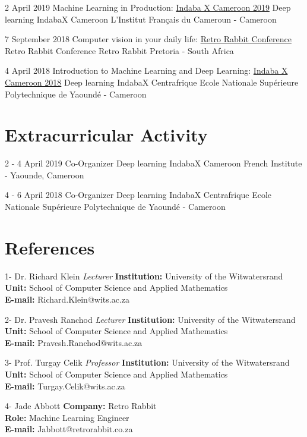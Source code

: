 \documentclass[letterpaper]{moderncv}        %
\begin{document}
\cventry
{2 April 2019}
{Machine Learning in Production:    \href{https://indabaxcameroon.github.io}{Indaba X Cameroon 2019}}
{Deep learning IndabaX Cameroon}
{L'Institut Français du Cameroun - Cameroon}
{}
{}


\cventry
{7 September 2018}
{Computer vision in your daily life: \href{https://www.youtube.com/watch?v=0Z--tiJ3FyE}
	{Retro Rabbit Conference}}
{Retro Rabbit Conference}
{Retro Rabbit Pretoria - South Africa}
{}
{}

\cventry
{4 April 2018}
{Introduction to Machine Learning and Deep Learning: \href{http://www.deeplearningindaba.com/indabax-centrafrique.html}{Indaba X Cameroon 2018}}
{Deep learning IndabaX Centrafrique}
{Ecole Nationale Supérieure Polytechnique de Yaoundé - Cameroon}
{}
{}
	
\section{Extracurricular Activity}	

\cventry
{2 - 4 April 2019}
{Co-Organizer Deep learning IndabaX Cameroon}
{French Institute - Yaounde, Cameroon}
{}
{}
{}


\cventry
{4 - 6 April 2018}
{Co-Organizer Deep learning IndabaX Centrafrique}
{Ecole Nationale Supérieure Polytechnique de Yaoundé - Cameroon}
{}
{}
{}


\section{References}
\cventry
{1-}
{Dr. Richard Klein}
{}
{\textit{Lecturer}}
{}
{\textbf{Institution:} University of the Witwatersrand\\
	\textbf{Unit:} School of Computer Science and Applied Mathematics\\
	\textbf{E-mail:} Richard.Klein@wits.ac.za}
\vspace{1mm}

\cventry
{2-}
{Dr. Pravesh Ranchod}
{}
{\textit{Lecturer}}
{}
{\textbf{Institution:} University of the Witwatersrand\\
	\textbf{Unit:} School of Computer Science and Applied Mathematics\\
	\textbf{E-mail:} Pravesh.Ranchod@wits.ac.za}
\vspace{1mm}

\cventry
{3-}
{Prof. Turgay Celik}
{}
{\textit{Professor}}
{}
{\textbf{Institution:} University of the Witwatersrand\\
	\textbf{Unit:} School of Computer Science and Applied Mathematics\\
	\textbf{E-mail:} Turgay.Celik@wits.ac.za}
\vspace{1mm}

\cventry
{4-}
{Jade Abbott}
{}
{}
{}
{\textbf{Company:} Retro Rabbit\\
	\textbf{Role:} Machine Learning Engineer\\
	\textbf{E-mail:} Jabbott@retrorabbit.co.za}
\vspace{1mm}
\end{document}
